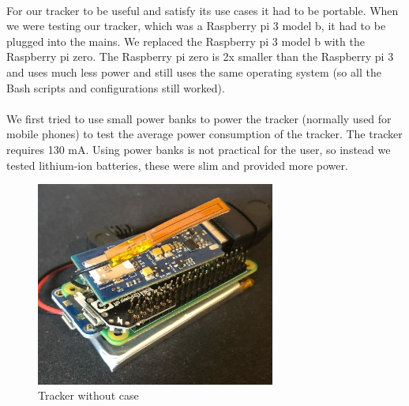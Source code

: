 \documentclass[12pt,a4paper]{article}
\begin{document}
        \paragraph{} For our tracker to be useful and satisfy its use cases it had to be portable. When we were testing our tracker, which was a Raspberry pi 3 model b, it had to be plugged into the mains. We replaced the Raspberry pi 3 model b with the Raspberry pi zero. The Raspberry pi zero is 2x smaller than the Raspberry pi 3 and uses much less power and still uses the same operating system (so all the Bash scripts and configurations still worked).
        
        \paragraph{} We first tried to use small power banks to power the tracker (normally used for mobile phones) to test the average power consumption of the tracker. The tracker requires 130 mA. Using power banks is not practical for the user, so instead we tested lithium-ion batteries, these were slim and provided more power. 
        
        
      
        \begin{figure}[H]
          \centering
          \includegraphics[width=0.7\textwidth]{../assets/design-tracker-without-case.jpg}
          \caption{Tracker without case}
          \label{fig:Tracker without case}
        \end{figure}
\end{document}
